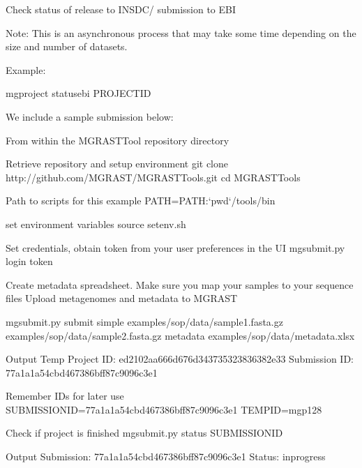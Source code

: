 \documentclass[letterpaper,10pt,english]{sphinxmanual}
\begin{document}
Check status of release to INSDC/ submission to EBI

Note: This is an asynchronous process that may take some time depending
on the size and number of datasets.

Example:

\begin{sphinxVerbatim}[commandchars=\\\{\}]
mg\PYGZhy{}project status\PYGZhy{}ebi \PYGZdl{}PROJECT\PYGZus{}ID
\end{sphinxVerbatim}

We include a sample submission below:

\begin{sphinxVerbatim}[commandchars=\\\{\}]
From within the MG\PYGZhy{}RAST\PYGZhy{}Tool repository directory

\PYGZsh{} Retrieve repository and setup environment
git clone http://github.com/MG\PYGZhy{}RAST/MG\PYGZhy{}RAST\PYGZhy{}Tools.git
cd MG\PYGZhy{}RAST\PYGZhy{}Tools

\PYGZsh{} Path to scripts for this example
PATH=\PYGZdl{}PATH:{}`pwd{}`/tools/bin

\PYGZsh{} set environment variables
source set\PYGZus{}env.sh

\PYGZsh{} Set credentials, obtain token from your user preferences in the UI
mg\PYGZhy{}submit.py login \PYGZhy{}\PYGZhy{}token

\PYGZsh{} Create metadata spreadsheet. Make sure you map your samples to your
\PYGZsh{} sequence files
\PYGZsh{} Upload metagenomes and metadata to MG\PYGZhy{}RAST

mg\PYGZhy{}submit.py submit simple \PYGZbs{}
           examples/sop/data/sample\PYGZus{}1.fasta.gz \PYGZbs{}
           examples/sop/data/sample\PYGZus{}2.fasta.gz \PYGZbs{}
           \PYGZhy{}\PYGZhy{}metadata examples/sop/data/metadata.xlsx

\PYGZsh{} Output
\PYGZgt{} Temp Project ID: ed2102aa666d676d343735323836382e33
\PYGZgt{} Submission ID: 77a1a1a5\PYGZhy{}4cbd\PYGZhy{}4673\PYGZhy{}86bf\PYGZhy{}f87c9096c3e1

\PYGZsh{} Remember IDs for later use
SUBMISSION\PYGZus{}ID=77a1a1a5\PYGZhy{}4cbd\PYGZhy{}4673\PYGZhy{}86bf\PYGZhy{}f87c9096c3e1
TEMP\PYGZus{}ID=mgp128

\PYGZsh{} Check if project is finished
mg\PYGZhy{}submit.py status \PYGZdl{}SUBMISSION\PYGZus{}ID

\PYGZsh{} Output
\PYGZgt{} Submission: 77a1a1a5\PYGZhy{}4cbd\PYGZhy{}4673\PYGZhy{}86bf\PYGZhy{}f87c9096c3e1 Status: in\PYGZhy{}progress



\end{sphinxVerbatim}
\end{document}

